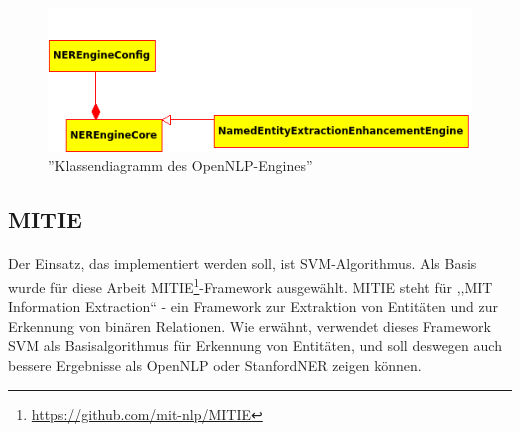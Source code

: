 \begin{figure}[ht]
\centering
\includegraphics[width=\textwidth]{Bilder/onlp-classes.png}
\caption{''Klassendiagramm  des OpenNLP-Engines''}
\label{fig:onlpuml}
\end{figure}

\subsection{MITIE}
\paragraph{}
Der Einsatz, das implementiert werden soll, ist SVM-Algorithmus. Als Basis wurde für diese Arbeit MITIE\footnote{\url{https://github.com/mit-nlp/MITIE}}-Framework ausgewählt. MITIE steht für ,,MIT Information Extraction`` - ein Framework zur Extraktion von Entitäten und zur Erkennung von binären Relationen. Wie erwähnt, verwendet dieses Framework SVM als Basisalgorithmus für Erkennung von Entitäten, und soll deswegen auch bessere Ergebnisse als OpenNLP oder StanfordNER zeigen können.

